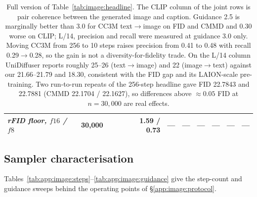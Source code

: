 \begin{table}[tb]
\begin{tabular}{llrrrrrrrrr}
\midrule
\emph{rFID floor, $f16$ / $f8$} & 30{,}000 & & & 1.59 / 0.73 & --- & --- & --- & --- & --- & --- \\
\bottomrule
\end{tabular}
\caption{Full version of Table~\ref{tab:image:headline}. The CLIP column of the joint rows is pair
coherence between the generated image and caption. Guidance 2.5 is marginally better than 3.0 for
CC3M text$\rightarrow$image on FID and CMMD and 0.30 worse on CLIP; L/14, precision and recall
were measured at guidance 3.0 only. Moving CC3M from 256 to 10 steps raises precision from 0.41 to
0.48 with recall 0.29$\rightarrow$0.28, so the gain is not a diversity-for-fidelity trade. On the
L/14 column UniDiffuser \citep{image:unidiffuser} reports roughly 25--26 (text$\rightarrow$image)
and 22 (image$\rightarrow$text) against our 21.66--21.79 and 18.30, consistent with the FID gap
and its LAION-scale pre-training. Two run-to-run repeats of the 256-step headline gave FID 22.7843
and 22.7881 (CMMD 22.1704 / 22.1627), so differences above $\approx0.05$ FID at $n{=}30{,}000$
are real effects.}
\label{tab:app:image:headline-full}
\end{table}

\subsection{Sampler characterisation}
\label{app:image:sampler}

Tables~\ref{tab:app:image:steps}--\ref{tab:app:image:guidance} give the step-count and guidance
sweeps behind the operating points of \S\ref{app:image:protocol}.

